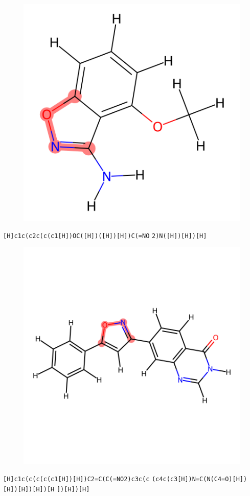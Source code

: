 \documentclass{article}
\begin{document}
\begin{figure}[ht]
\centering
    \includegraphics{mol46.png}
\end{figure}
\verb|[H]c1c(c2c(c(c1[H])OC([H])([H])[H])C(=NO| \verb|2)N([H])[H])[H]|

\begin{figure}[ht]
\centering
    \includegraphics{mol47.png}
\end{figure}
\verb|[H]c1c(c(c(c(c1[H])[H])C2=C(C(=NO2)c3c(c| \verb|(c4c(c3[H])N=C(N(C4=O)[H])[H])[H])[H])[H| \verb|])[H])[H]|
\end{document}
